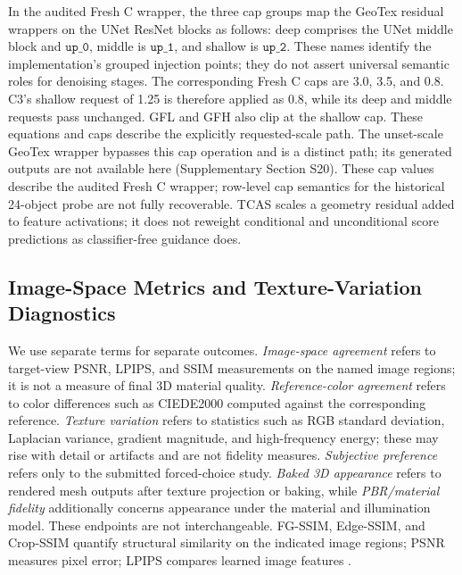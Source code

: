 \documentclass[times,twocolumn,final]{elsarticle}
\providecommand{\DIFadd}[1]{{\protect\color{blue} \sf #1}} %
\providecommand{\DIFaddbegin}{} %
\providecommand{\DIFaddend}{} %
\begin{document}
\DIFadd{In the audited Fresh C wrapper, }\DIFaddend the   \DIFaddbegin \DIFadd{three cap groups map the GeoTex residual wrappers on the UNet ResNet blocks as follows: deep comprises the UNet middle block and $\texttt{up\_0}$, middle is $\texttt{up\_1}$, and shallow is $\texttt{up\_2}$. These names identify the implementation's grouped injection points; they do not assert universal semantic roles for denoising stages. The corresponding Fresh C caps are 3.0, 3.5, and 0.8. C3's shallow request of 1.25 is therefore applied as 0.8, while its deep and middle requests pass unchanged. GFL and GFH also clip at the shallow cap. These equations and caps describe the explicitly requested-scale path. The unset-scale GeoTex wrapper bypasses this cap operation and is a distinct path; its generated outputs are not available here (Supplementary Section S20). These cap values describe the audited Fresh C wrapper; row-level cap semantics for the historical 24-object probe are not fully recoverable. TCAS scales a geometry }\DIFaddend residual added to   \DIFaddbegin \DIFadd{feature activations; it does not reweight conditional and unconditional score predictions as classifier-free guidance does.
}\DIFaddend 

  \DIFaddbegin \subsection{Image-Space Metrics and Texture-Variation Diagnostics}
\DIFaddend \label{subsec:metrics}

  \DIFaddbegin \DIFadd{We use separate terms for separate outcomes. \emph{Image-space agreement} refers to target-view PSNR, LPIPS, and SSIM measurements on the named image regions; it is not a measure of final 3D material quality. \emph{Reference-color agreement} refers to color differences such as CIEDE2000 computed against the corresponding reference. \emph{Texture variation} refers to statistics such as RGB standard deviation, Laplacian variance, gradient magnitude, and high-frequency energy; these may rise with detail or artifacts and are not fidelity measures. \emph{Subjective preference} refers only to the submitted forced-choice study. \emph{Baked 3D appearance} refers to rendered mesh outputs after texture projection or baking, while \emph{PBR/material fidelity} additionally concerns appearance under the material and illumination model. These endpoints are not interchangeable. }\DIFaddend FG-SSIM, Edge-SSIM, and Crop-SSIM   \DIFaddbegin \DIFadd{quantify structural similarity on the indicated image regions; PSNR measures pixel error; LPIPS compares learned image features \cite{wang2004ssim,zhang2018lpips}.
}
\end{document}
